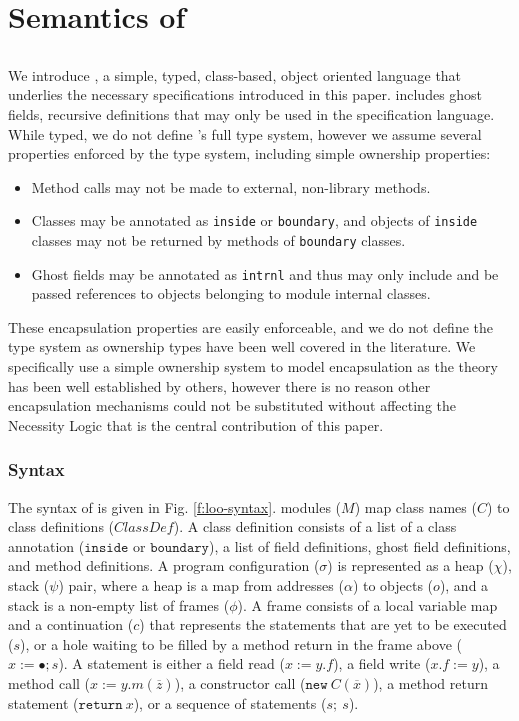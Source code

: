 \section{Semantics of \Chainmail}
\label{s:semantics}

\subsection{\Loo}

We introduce \Loo, a simple, typed, class-based, object oriented language that underlies the necessary specifications
introduced in this paper. \Loo includes ghost fields, recursive definitions that may only be
used in the specification language.
While typed, we do not define \Loo's
full type system, however we assume several properties enforced by the type system, including 
simple ownership properties:
\begin{itemize}
\item
Method calls may not be made to external, non-library methods.
\item
Classes may be annotated as \texttt{inside} or \texttt{boundary}, and objects of \texttt{inside} classes may not be returned by methods of \texttt{boundary} classes.
\item
Ghost fields may be annotated as \texttt{intrnl} and thus may only include and be passed references to objects belonging to module internal classes.
\end{itemize}
These encapsulation properties are easily enforceable, and we
do not define the type system as ownership types have been 
well covered in the literature. 
We specifically use a simple ownership system to model 
encapsulation as the theory has been well established by others, 
however there is no reason other encapsulation mechanisms could 
not be substituted without affecting the Necessity Logic that 
is the central contribution of this paper.

\subsubsection{\Loo Syntax}
The syntax of \Loo is given in Fig. \ref{f:loo-syntax}.
\Loo modules ($M$) map class names ($C$) to class definitions ($\textit{ClassDef}$).
A class definition consists of a list of a class annotation ($\texttt{inside}$ or $\texttt{boundary}$),
a list of field definitions, ghost field definitions, and method definitions.
A program configuration ($\sigma$) is represented as a heap ($\chi$), stack ($\psi$) pair, 
where a heap is a map from addresses ($\alpha$) to objects ($o$), and a stack is a non-empty list of frames ($\phi$). A frame consists of a local variable
map and a continuation ($c$) that represents the statements that are yet to be executed ($s$),
or a hole waiting to be filled by a method return in the frame above ($x := \bullet; s$).
A statement is either a field read ($x := y.f$), a field write ($x.f := y$), a method call
($x := y.m(\overline{z})$), a constructor call ($\texttt{new}\ C(\overline{x})$), a method return statement
($\texttt{return}\ x$), or a sequence of statements ($s;\ s$).

